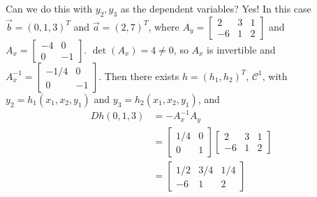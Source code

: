 \begin{eg}
    Can we do this with $y_2,y_3$ as the dependent variables? Yes! In this case $\vec{b} = (0,1,3)^T$ and $\vec{a} = (2,7)^T$, where $A_y = \begin{bmatrix} 2 & 3 & 1 \\ -6 & 1 & 2 \end{bmatrix}$ and $A_x = \begin{bmatrix} -4 & 0 \\ 0 & -1 \end{bmatrix}$. $\det(A_x) = 4\neq 0$, so $A_x$ is invertible and $A_x^{-1} = \begin{bmatrix} -1/4 & 0 \\ 0 & -1 \end{bmatrix}$. Then there exists $h = (h_1,h_2)^T$, $\mathcal{C}^1$, with $y_2 = h_1(x_1,x_2,y_1)$ and $y_3 = h_2(x_1,x_2,y_1)$, and \begin{align*}
        Dh(0,1,3) &= -A_x^{-1}A_y \\
        &= \begin{bmatrix} 1/4 & 0 \\ 0 & 1 \end{bmatrix}\begin{bmatrix} 2 & 3 & 1 \\ -6 & 1 & 2 \end{bmatrix} \\
        &= \begin{bmatrix} 1/2 & 3/4 & 1/4 \\ -6 & 1 & 2 \end{bmatrix}
    \end{align*}
\end{eg}

